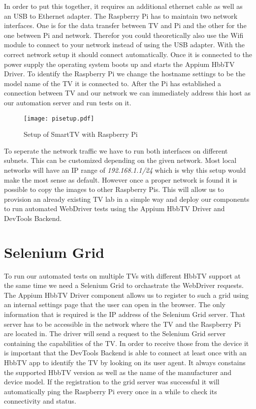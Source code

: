 In order to put this together, it requires an additional ethernet cable as well as an USB to Ethernet
adapter. The Raspberry Pi has to maintain two network interfaces. One is for the data transfer between
TV and Pi and the other for the one between Pi and network. Therefor you could theoretically also use
the Wifi module to connect to your network instead of using the USB adapter. With the correct network
setup it should connect automatically. Once it is connected to the power supply the operating system
boots up and starts the Appium HbbTV Driver. To identify the Raspberry Pi we change the hostname
settings to be the model name of the TV it is connected to. After the Pi has established a connection
between TV and our network we can immediately address this host as our automation server and run tests
on it.

\vspace{1cm}
\begin{figure}[htb]
  \centering
  \texttt{[image: pisetup.pdf]}\\
  \caption{Setup of SmartTV with Raspberry Pi}\label{fig:pisetup}
\end{figure}
\vspace{0.5cm}

To seperate the network traffic we have to run both interfaces on different subnets. This can be
customized depending on the given network. Most local networks will have an IP range of
\textit{192.168.1.1/24} which is why this setup would make the most sense as default. However
once a proper network is found it is possible to copy the images to other Raspberry Pis. This will
allow us to provision an already existing TV lab in a simple way and deploy our components to run
automated WebDriver tests using the Appium HbbTV Driver and DevTools Backend.

\section{Selenium Grid\label{sec:grid}}

To run our automated tests on multiple TVs with different HbbTV support at the same time we need
a Selenium Grid to orchastrate the WebDriver requests. The Appium HbbTV Driver component allows us
to register to such a grid using an internal settings page that the user can open in the browser.
The only information that is required is the IP address of the Selenium Grid server. That server
has to be accessible in the network where the TV and the Raspberry Pi are located in. The driver
will send a request to the Selenium Grid server containing the capabilities of the TV. In order to
receive those from the device it is important that the DevTools Backend is able to connect at least
once with an HbbTV app to identify the TV by looking on its user agent. It always constains the
supported HbbTV version as well as the name of the manufacturer and device model. If the registration
to the grid server was successful it will automatically ping the Raspberry Pi every once in a while
to check its connectivity and status.

